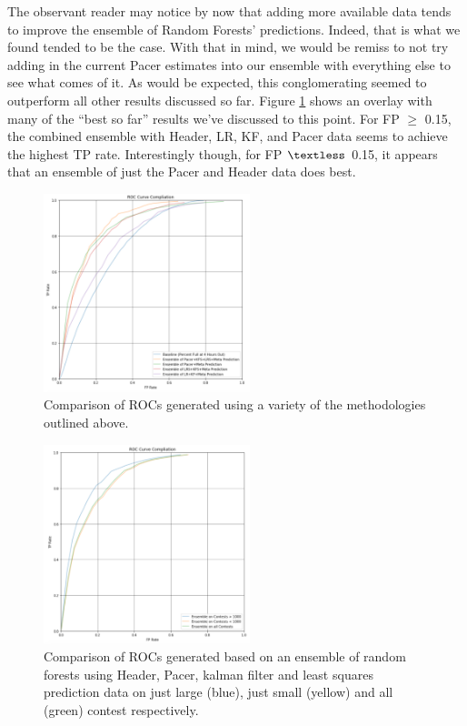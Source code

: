 The observant reader may notice by now that adding more available data tends to improve the ensemble of Random Forests' predictions. Indeed, that is what we found tended to be the case. With that in mind, we would be remiss to not try adding in the current Pacer estimates into our ensemble with everything else to see what comes of it. As would be expected, this conglomerating seemed to outperform all other results discussed so far. Figure \ref{fig:everything} shows an overlay with many of the ``best so far'' results we've discussed to this point. For FP $\geq$ 0.15, the combined ensemble with Header, LR, KF, and Pacer data seems to achieve the highest TP rate. Interestingly though, for FP $\textless$ 0.15, it appears that an ensemble of just the Pacer and Header data does best.

\begin{figure}[h]
\centering
\includegraphics[width=6cm]{body/results/everything.png}
\caption{Comparison of ROCs generated using a variety of the methodologies outlined above.}
\label{fig:everything}
\end{figure}

\begin{figure}[h]
\centering
\includegraphics[width=6cm]{body/results/sizeSplit.png}
\caption{Comparison of ROCs generated based on an ensemble of random forests using Header, Pacer, kalman filter and least squares prediction data on just large (blue), just small (yellow) and all (green) contest respectively.}
\label{fig:sizeSplit}
\end{figure}


